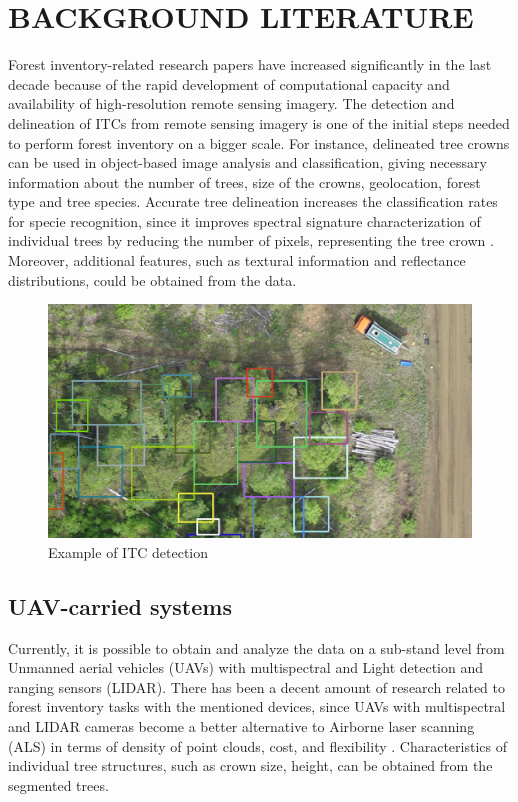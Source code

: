 \renewcommand\chaptername{}
\chapter{BACKGROUND LITERATURE}

Forest inventory-related research papers have increased significantly in the last decade because of the rapid development of computational capacity and availability of high-resolution remote sensing imagery. The detection and delineation of \gls{ITC}s from remote sensing imagery is one of the initial steps needed to perform forest inventory on a bigger scale. For instance, delineated tree crowns can be used in object-based image analysis and classification, giving necessary information about the number of trees, size of the crowns, geolocation, forest type and tree species. Accurate tree delineation increases the classification rates for specie recognition, since it improves spectral signature characterization of individual trees by reducing the number of pixels, representing the tree crown \cite{Wagner2018}. Moreover, additional features, such as textural information and reflectance distributions, could be obtained from the data.

\begin{figure}[ht]
\centering
\includegraphics[scale=0.3]{images/ObjDet.png}
\caption{Example of ITC detection}
\label{ObjDet}
\end{figure}

\section{UAV-carried systems}

Currently, it is possible to obtain and analyze the data on a sub-stand level from Unmanned aerial vehicles (\gls{UAV}s) with multispectral and Light detection and ranging sensors (\gls{LIDAR}). There has been a decent amount of research related to forest inventory tasks with the mentioned devices, since UAVs with multispectral and LIDAR cameras become a better alternative to Airborne laser scanning (\gls{ALS}) in terms of density of point clouds, cost, and flexibility \cite{Hamraz2019}. Characteristics of individual tree structures, such as crown size, height, can be obtained from the segmented trees.

